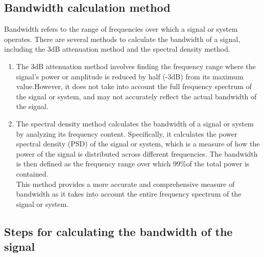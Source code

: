 \documentclass[journal,5pt,twocolumn]{IEEEtran}
\begin{document}
\subsection{\textbf{Bandwidth calculation method}}

Bandwidth refers to the range of frequencies over which a signal or system operates. There are several methods to calculate the bandwidth of a signal, including the 3dB attenuation method and the spectral density method.\\
\begin{enumerate}
\item  The 3dB attenuation method involves finding the frequency range where the signal's power or amplitude is reduced by half (-3dB) from its maximum value.However, it does not take into account the full frequency spectrum of the signal or system, and may not accurately reflect the actual bandwidth of the signal.

\item The spectral density method calculates the bandwidth of a signal or system by analyzing its frequency content. Specifically, it calculates the power spectral density (PSD) of the signal or system, which is a measure of how the power of the signal is distributed across different frequencies. The bandwidth is then defined as the frequency range over which 99\%of the total power is contained.\\
 This method provides a more accurate and comprehensive measure of bandwidth as it takes into account the entire frequency spectrum of the signal or system.
\end{enumerate}

\subsection{\textbf{Steps for calculating the bandwidth of the signal}}
   
\end{document}
